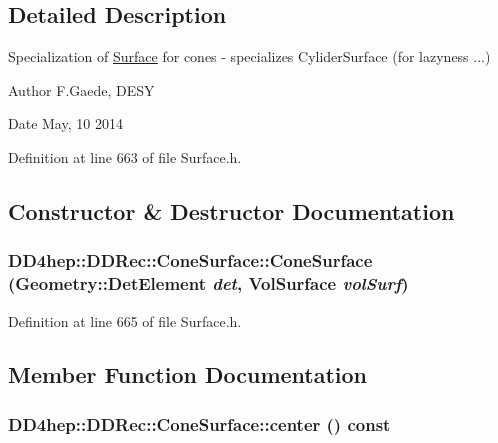 \subsection{Detailed Description}
Specialization of \hyperlink{class_d_d4hep_1_1_d_d_rec_1_1_surface}{Surface} for cones -\/ specializes CyliderSurface (for lazyness ...) \begin{DoxyAuthor}{Author}
F.Gaede, DESY 
\end{DoxyAuthor}
\begin{DoxyDate}{Date}
May, 10 2014 
\end{DoxyDate}


Definition at line 663 of file Surface.h.

\subsection{Constructor \& Destructor Documentation}
\hypertarget{class_d_d4hep_1_1_d_d_rec_1_1_cone_surface_ac1cbae9a5b60607333e532ffff9fb998}{
\subsubsection[{ConeSurface}]{\setlength{\rightskip}{0pt plus 5cm}DD4hep::DDRec::ConeSurface::ConeSurface ({\bf Geometry::DetElement} {\em det}, \/  {\bf VolSurface} {\em volSurf})}}
\label{class_d_d4hep_1_1_d_d_rec_1_1_cone_surface_ac1cbae9a5b60607333e532ffff9fb998}


Definition at line 665 of file Surface.h.

\subsection{Member Function Documentation}
\hypertarget{class_d_d4hep_1_1_d_d_rec_1_1_cone_surface_abfdad3ecbda7070c2b2b4b4d48b23ccb}{
\subsubsection[{center}]{ DD4hep::DDRec::ConeSurface::center () const}}
\label{class_d_d4hep_1_1_d_d_rec_1_1_cone_surface_abfdad3ecbda7070c2b2b4b4d48b23ccb}


